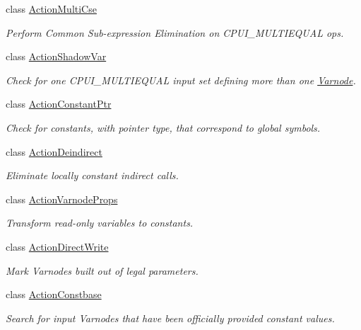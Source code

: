 \begin{DoxyCompactItemize}
class \mbox{\hyperlink{class_action_multi_cse}{Action\+Multi\+Cse}}
\begin{DoxyCompactList}\small\item\em Perform Common Sub-\/expression Elimination on C\+P\+U\+I\+\_\+\+M\+U\+L\+T\+I\+E\+Q\+U\+AL ops. \end{DoxyCompactList}\item 
class \mbox{\hyperlink{class_action_shadow_var}{Action\+Shadow\+Var}}
\begin{DoxyCompactList}\small\item\em Check for one C\+P\+U\+I\+\_\+\+M\+U\+L\+T\+I\+E\+Q\+U\+AL input set defining more than one \mbox{\hyperlink{class_varnode}{Varnode}}. \end{DoxyCompactList}\item 
class \mbox{\hyperlink{class_action_constant_ptr}{Action\+Constant\+Ptr}}
\begin{DoxyCompactList}\small\item\em Check for constants, with pointer type, that correspond to global symbols. \end{DoxyCompactList}\item 
class \mbox{\hyperlink{class_action_deindirect}{Action\+Deindirect}}
\begin{DoxyCompactList}\small\item\em Eliminate locally constant indirect calls. \end{DoxyCompactList}\item 
class \mbox{\hyperlink{class_action_varnode_props}{Action\+Varnode\+Props}}
\begin{DoxyCompactList}\small\item\em Transform read-\/only variables to constants. \end{DoxyCompactList}\item 
class \mbox{\hyperlink{class_action_direct_write}{Action\+Direct\+Write}}
\begin{DoxyCompactList}\small\item\em Mark Varnodes built out of {\itshape legal} parameters. \end{DoxyCompactList}\item 
class \mbox{\hyperlink{class_action_constbase}{Action\+Constbase}}
\begin{DoxyCompactList}\small\item\em Search for input Varnodes that have been officially provided constant values. \end{DoxyCompactList}\item 

\end{DoxyCompactItemize}
